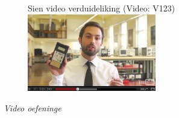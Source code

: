 {\begin{figure}[h]
\begin{center}
Sien video verduideliking  (Video: V123)\\
\includegraphics[width=0.5\textwidth]{../title_images/veritasiumvideo.png}
\end{center}
\end{figure}

}


\vspace{0.5cm}
{\normalfont\sffamily\fontsize{22}\normalfont\itshape Video oefeninge} \par

